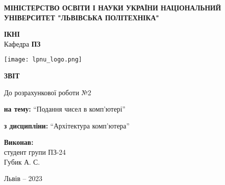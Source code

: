\documentclass[12pt]{extarticle}
\begin{document}
\begin{titlepage}
    \begin{center}
        \textbf{\normalsize{\MakeUppercase{
            Міністерство Освіти і науки України
            Національний університет "Львівська політехніка"
        }}}

        \begin{flushright}
        \textbf{ІКНІ}\\
        Кафедра \textbf{ПЗ}
        \end{flushright}
        \vspace{15mm}

        \texttt{[image: lpnu\_logo.png]}

        \vspace*{\fill}

        \textbf{\normalsize{\MakeUppercase{Звіт}}}
            
        До розрахункової роботи №2

        \textbf{на тему:} “Подання чисел в комп’ютері”

        \textbf{з дисципліни:} “Архітектура комп’ютера”
            
        \vspace*{\fill}

        \begin{flushright}


            \textbf{Виконав:}\\
            студент групи ПЗ-24\\
            Губик А. С.\\
            \vspace{12pt}

        \vspace{12pt}
        \end{flushright}

        Львів -- 2023
            
            
    \end{center}
\end{titlepage}
\end{document}
